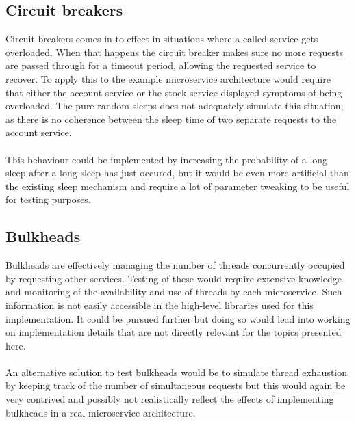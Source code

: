 \subsection{Circuit breakers}
Circuit breakers comes in to effect in situations where a called
service gets overloaded. When that happens the circuit breaker makes
sure no more requests are passed through for a timeout period,
allowing the requested service to recover. To apply this to the
example microservice architecture would require that either the
account service or the stock service displayed symptoms of being
overloaded. The pure random sleeps does not adequately simulate this
situation, as there is no coherence between the sleep time of two
separate requests to the account service.
\\\\
This behaviour could be implemented by increasing the probability of a
long sleep after a long sleep has just occured, but it would be even
more artificial than the existing sleep mechanism and require a lot of
parameter tweaking to be useful for testing purposes.

\subsection{Bulkheads}
Bulkheads are effectively managing the number of threads concurrently
occupied by requesting other services. Testing of these would require
extensive knowledge and monitoring of the availability and use of
threads by each microservice. Such information is not easily
accessible in the high-level libraries used for this
implementation. It could be pursued further but doing so would lead
into working on implementation details that are not directly relevant
for the topics presented here.
\\\\
An alternative solution to test bulkheads would be to simulate thread
exhaustion by keeping track of the number of simultaneous requests but
this would again be very contrived and possibly not realistically
reflect the effects of implementing bulkheads in a real microservice
architecture.
